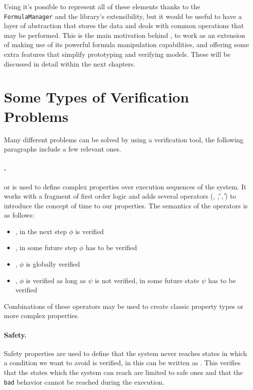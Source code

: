 Using \pysmt{} it's possible to represent all of these elements thanks to the \texttt{FormulaManager} and the library's extensibility, but it would be useful to have a layer of abstraction that stores the data and deals with common operations that may be performed.
This is the main motivation behind \pyvmt{}, to work as an extension of \pysmt{} making use of its powerful formula manipulation capabilities, and offering some extra features that simplify prototyping and verifying models. These will be discussed in detail within the next chapters.


\section{Some Types of Verification Problems}
Many different problems can be solved by using a verification tool, the following paragraphs include a few relevant ones.

\paragraph*{\ltl{}.} \ltl{} or \LTL{} is used to define complex properties over execution sequences of the system.
It works with a fragment of first order logic and adds several operators (\X{}, \F{}, \G{}, \U{}) to introduce the concept of time to our properties.
The semantics of the operators is as follows:
\begin{itemize}
    \item \fX{}, in the next step $\phi$ is verified
    \item \fF{}, in some future step $\phi$ has to be verified
    \item \fG{}, $\phi$ is globally verified
    \item \fU{}, $\phi$ is verified as long as $\psi$ is not verified, in some future state $\psi$ has to be verified
\end{itemize}

Combinations of these operators may be used to create classic property types or more complex properties.

\paragraph*{Safety.} Safety properties are used to define that the system never reaches states in which a condition we want to avoid is verified, in \ltl{} this can be written as \fsafe{}.
This verifies that the states which the system can reach are limited to safe ones and that the \texttt{bad} behavior cannot be reached during the execution.

